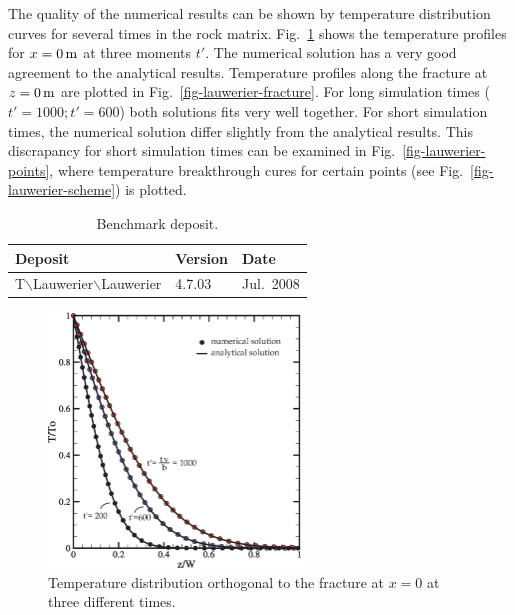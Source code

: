 The quality of the numerical results can be shown by temperature distribution curves for several times in the rock matrix. Fig.~\ref{fig-lauwerier-rock} shows the temperature profiles for $x=\unit[0]{m}$ at three moments $t'$. The numerical solution has a very good agreement to the analytical results. Temperature profiles along the fracture at $z=\unit[0]{m}$ are plotted in Fig.~\ref{fig-lauwerier-fracture}. For long simulation times ( $t'=1000; t'=600$) both solutions fits very well together. For short simulation times, the numerical solution differ slightly from the analytical results. This discrapancy for short simulation times can be examined in Fig.~\ref{fig-lauwerier-points}, where temperature breakthrough cures for certain points (see Fig.~\ref{fig-lauwerier-scheme}) is plotted.
\begin{table}[h]
\caption{Benchmark deposit.}
\begin{center}
\begin{tabular}{lll}
\toprule
Deposit & Version & Date \\
\midrule
T$\backslash$Lauwerier$\backslash$Lauwerier & 4.7.03 & Jul.~2008 \\
\bottomrule
\end{tabular}
\end{center}
\end{table}
\begin{figure}[H]
\centering
\includegraphics[width=0.6\textwidth]{T/figures/lauwerier-rock.eps}
\caption{Temperature distribution orthogonal to the fracture at $x=0$ at three different times.}
\label{fig-lauwerier-rock}
\end{figure}
